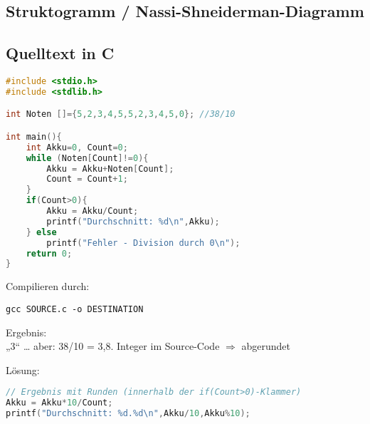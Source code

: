 \subsection[Struktogramm]{Struktogramm / Nassi-Shneiderman-Diagramm}


\subsection{Quelltext in C}

\begin{lstlisting}[language=C]
#include <stdio.h>
#include <stdlib.h>

int Noten []={5,2,3,4,5,5,2,3,4,5,0}; //38/10

int main(){
	int Akku=0, Count=0;
	while (Noten[Count]!=0){
		Akku = Akku+Noten[Count];
		Count = Count+1;
	}
	if(Count>0){
		Akku = Akku/Count;
		printf("Durchschnitt: %d\n",Akku);
	} else
		printf("Fehler - Division durch 0\n");
	return 0;
}
\end{lstlisting}

Compilieren durch: 
\begin{lstlisting}
gcc SOURCE.c -o DESTINATION
\end{lstlisting}

Ergebnis:\\
„3“ … aber: 38/10 = 3,8. Integer im Source-Code $\Rightarrow$ abgerundet

Lösung:
\begin{lstlisting}[language=C]
// Ergebnis mit Runden (innerhalb der if(Count>0)-Klammer)
Akku = Akku*10/Count;
printf("Durchschnitt: %d.%d\n",Akku/10,Akku%10);
\end{lstlisting}

